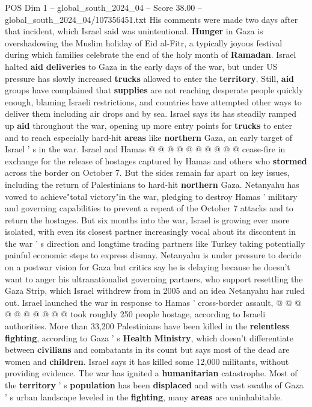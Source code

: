 \begin{textsample}{POS Dim 1 – global\_south\_2024\_04 – Score 38.00 – global\_south\_2024\_04/107356451.txt}
His comments were made two days after that incident, which Israel said was unintentional. \textbf{Hunger} in Gaza is overshadowing the Muslim holiday of Eid al-Fitr, a typically joyous festival during which families celebrate the end of the holy month of \textbf{Ramadan}.
Israel halted \textbf{aid} \textbf{deliveries} to Gaza in the early days of the war, but under US pressure has slowly increased \textbf{trucks} allowed to enter the \textbf{territory}.
Still, \textbf{aid} groups have complained that \textbf{supplies} are not reaching desperate people quickly enough, blaming Israeli restrictions, and countries have attempted other ways to deliver them including air drops and by sea.
Israel says its has steadily ramped up \textbf{aid} throughout the war, opening up more entry points for \textbf{trucks} to enter and to reach especially hard-hit \textbf{areas} like \textbf{northern} Gaza, an early target of Israel ' s in the war.
Israel and Hamas @ @ @ @ @ @ @ @ @ @ cease-fire in exchange for the release of hostages captured by Hamas and others who \textbf{stormed} across the border on October 7.
But the sides remain far apart on key issues, including the return of Palestinians to hard-hit \textbf{northern} Gaza.
Netanyahu has vowed to achieve"total victory"in the war, pledging to destroy Hamas ' military and governing capabilities to prevent a repeat of the October 7 attacks and to return the hostages.
But six months into the war, Israel is growing ever more isolated, with even its closest partner increasingly vocal about its discontent in the war ' s direction and longtime trading partners like Turkey taking potentially painful economic steps to express dismay.
Netanyahu is under pressure to decide on a postwar vision for Gaza but critics say he is delaying because he doesn't want to anger his ultranationalist governing partners, who support resettling the Gaza Strip, which Israel withdrew from in 2005 and an idea Netanyahu has ruled out.
Israel launched the war in response to Hamas ' cross-border assault, @ @ @ @ @ @ @ @ @ @ took roughly 250 people hostage, according to Israeli authorities.
More than 33,200 Palestinians have been killed in the \textbf{relentless} \textbf{fighting}, according to Gaza ' s \textbf{Health} \textbf{Ministry}, which doesn't differentiate between \textbf{civilians} and combatants in its count but says most of the dead are women and \textbf{children}.
Israel says it has killed some 12,000 militants, without providing evidence.
The war has ignited a \textbf{humanitarian} catastrophe.
Most of the \textbf{territory} ' s \textbf{population} has been \textbf{displaced} and with vast swaths of Gaza ' s urban landscape leveled in the \textbf{fighting}, many \textbf{areas} are uninhabitable.

\end{textsample}
